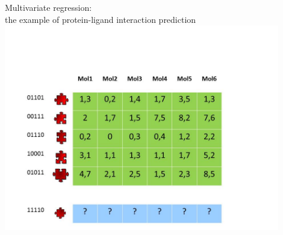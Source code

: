 \documentclass[]{beamer}
\begin{document}
\begin{frame}{Multivariate regression: \\
the example of protein-ligand interaction prediction}
\includegraphics[width=0.9\textwidth,trim = 0 0 100 100,clip]{Figures/pictures/Slide1}
\end{frame}

\begin{frame}[plain]
     \end{frame}
\end{document}
